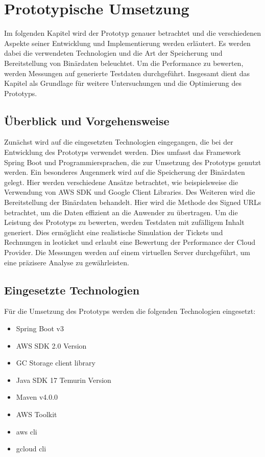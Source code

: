 \chapter{Prototypische Umsetzung}     

Im folgenden Kapitel wird der Prototyp genauer betrachtet und die verschiedenen Aspekte seiner Entwicklung und Implementierung werden erläutert. Es werden dabei die verwendeten Technologien und die Art der Speicherung und Bereitstellung von Binärdaten beleuchtet. Um die Performance zu bewerten, werden Messungen auf generierte Testdaten durchgeführt. Insgesamt dient das Kapitel als Grundlage für weitere Untersuchungen und die Optimierung des Prototyps.\\                               

\section{Überblick und Vorgehensweise}

Zunächst wird auf die eingesetzten Technologien eingegangen, die bei der Entwicklung des Prototyps verwendet werden. Dies umfasst das Framework Spring Boot und Programmiersprachen, die zur Umsetzung des Prototyps genutzt werden. Ein besonderes Augenmerk wird auf die Speicherung der Binärdaten gelegt. Hier werden verschiedene Ansätze betrachtet, wie beispielsweise die Verwendung von AWS SDK und Google Client Libraries. Des Weiteren wird die Bereitstellung der Binärdaten behandelt. Hier wird die Methode des Signed URLs betrachtet, um die Daten effizient an die Anwender zu übertragen. Um die Leistung des Prototyps zu bewerten, werden Testdaten mit zufälligem Inhalt generiert. Dies ermöglicht eine realistische Simulation der Tickets und Rechnungen in leoticket und erlaubt eine Bewertung der Performance der Cloud Provider. Die Messungen werden auf einem virtuellen Server durchgeführt, um eine präzisere Analyse zu gewährleisten.\\

\newpage

\section{Eingesetzte Technologien}

Für die Umsetzung des Prototyps werden die folgenden Technologien eingesetzt:

\begin{itemize}
	\item Spring Boot v3
	\item AWS SDK 2.0 Version
	\item GC Storage client library
	\item Java SDK 17 Temurin Version
	\item Maven v4.0.0
	\item AWS Toolkit
	\item aws cli
	\item gcloud cli
\end{itemize}

